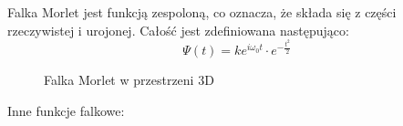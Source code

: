 Falka Morlet jest funkcją zespoloną, co oznacza, że składa się z części rzeczywistej i urojonej. Całość jest zdefiniowana następująco:
\begin{equation}
    \Psi(t)=k e^{i \omega_0 t} \cdot e^{-\frac{t^2}{2}}
\end{equation}

\begin{figure}[ht]
    \centering
    \caption{Falka Morlet w przestrzeni 3D}
    \label{fig:image30}
\end{figure}

Inne funkcje falkowe:


